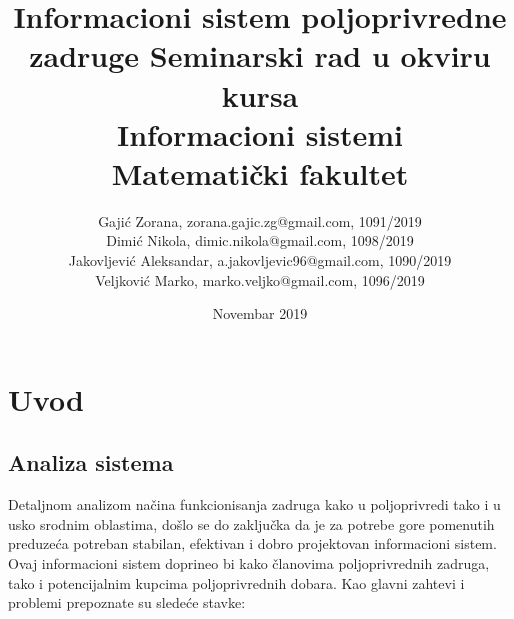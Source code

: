 \documentclass[a4paper]{article}
\begin{document}

\title{Informacioni sistem poljoprivredne zadruge \small{Seminarski rad u okviru kursa\\Informacioni sistemi\\ Matematički fakultet}}

\author{Gajić Zorana, zorana.gajic.zg@gmail.com, 1091/2019 \\ 
        Dimić Nikola, dimic.nikola@gmail.com, 1098/2019 \\
        Jakovljević Aleksandar, a.jakovljevic96@gmail.com, 1090/2019 \\ 
        Veljković Marko, marko.veljko@gmail.com, 1096/2019}

\date{Novembar 2019}

\maketitle

\newpage

\tableofcontents

\newpage


\section{Uvod}
\subsection{Analiza sistema}

Detaljnom analizom načina funkcionisanja zadruga kako u poljoprivredi tako i u usko srodnim oblastima, došlo se do zaključka da je za potrebe gore pomenutih preduzeća potreban stabilan, efektivan i dobro projektovan informacioni sistem. Ovaj informacioni sistem doprineo bi kako članovima poljoprivrednih zadruga, tako i potencijalnim kupcima poljoprivrednih dobara. Kao glavni zahtevi i problemi prepoznate su sledeće stavke:
\end{document}
